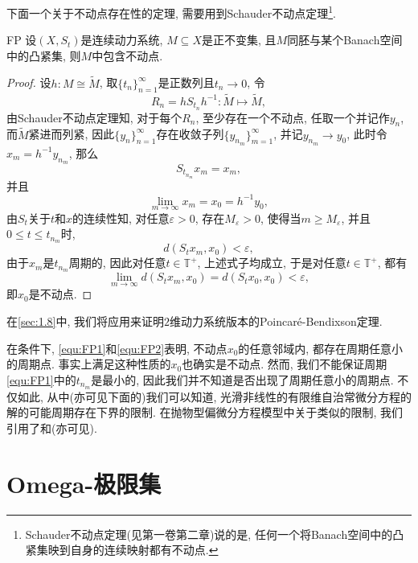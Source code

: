 下面一个关于不动点存在性的定理, 需要用到Schauder不动点定理\footnote{Schauder不动点定理(见\cite{Zeidler86}第一卷第二章)说的是, 任何一个将Banach空间中的凸紧集映到自身的连续映射都有不动点.}.

\begin{theorem}{}{FP}
	设$(X,S_{t})$是连续动力系统, $M\subseteq X$是正不变集, 且$M$同胚与某个Banach空间中的凸紧集, 则$M$中包含不动点.
\end{theorem}

\begin{proof}
	设$h:M\cong\tilde{M}$, 取$\{t_{n}\}_{n=1}^{\infty}$是正数列且$t_{n}\to 0$, 令$$R_{n}=hS_{t_{n}}h^{-1}:\tilde{M}\mapsto\tilde{M},$$ 由Schauder不动点定理知, 对于每个$R_{n}$, 至少存在一个不动点, 任取一个并记作$y_{n}$, 而$\tilde{M}$紧进而列紧, 因此$\{y_{n}\}_{n=1}^{\infty}$存在收敛子列$\{y_{n_{m}}\}_{m=1}^{\infty}$, 并记$y_{n_{m}}\to y_{0}$, 此时令$x_{m}=h^{-1}y_{n_{m}}$, 那么
	\begin{equation}\label{equ:FP1}
		S_{t_{n_{m}}}x_{m}=x_{m},
	\end{equation}
	并且
	\begin{equation}\label{equ:FP2}
		\lim_{m\to\infty}x_{m}=x_{0}=h^{-1}y_{0},
	\end{equation} 由$S_{t}$关于$t$和$x$的连续性知, 对任意$\varepsilon>0$, 存在$M_{\varepsilon}>0$, 使得当$m\geqslant M_{\varepsilon}$, 并且$0\leqslant t\leqslant t_{n_{m}}$时, $$
	d(S_{t}x_{m},x_{0})< \varepsilon,$$由于$x_{m}$是$t_{n_{m}}$周期的, 因此对任意$t\in\mathbb{T}^{+}$, 上述式子均成立, 于是对任意$t\in\mathbb{T}^{+}$, 都有$$\lim_{m\to\infty}d(S_{t}x_{m},x_{0})=d(S_{t}x_{0},x_{0})<\varepsilon,$$即$x_{0}$是不动点.
\end{proof}

在\ref{sec:1.8}中, 我们将应用来证明$2$维动力系统版本的Poincar\'{e}-Bendixson定理.

\begin{remark}{}{}
	在条件下, \ref{equ:FP1}和\ref{equ:FP2}表明, 不动点$x_{0}$的任意邻域内, 都存在周期任意小的周期点. 事实上满足这种性质的$x_{0}$也确实是不动点. 然而, 我们不能保证周期\ref{equ:FP1}中的$t_{n_{m}}$是最小的, 因此我们并不知道是否出现了周期任意小的周期点. 不仅如此, 从\cite{Yorke69}中(亦可见下面的)我们可以知道, 光滑非线性的有限维自治常微分方程的解的可能周期存在下界的限制. 在抛物型偏微分方程模型中关于类似的限制, 我们引用了\cite{Robinson06}和\cite{Robinson13}(亦可见\cite{Robinson11}). 
\end{remark}

\section{Omega-极限集}
